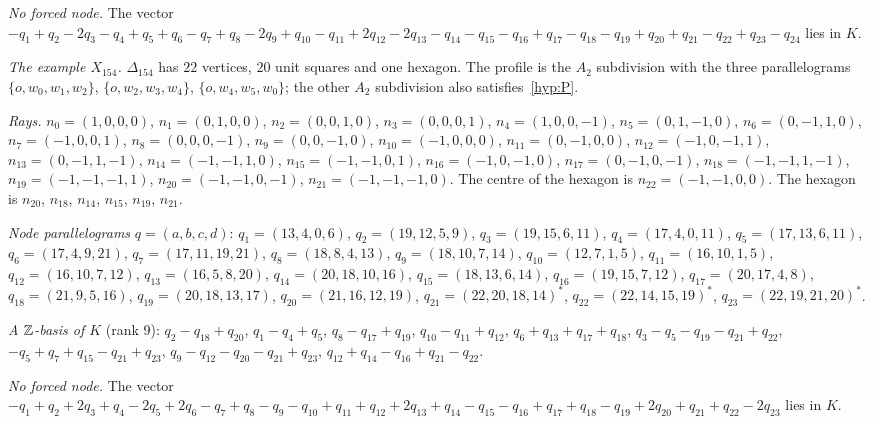 \emph{No forced node.} The vector $-q_{1}+q_{2}-2q_{3}-q_{4}+q_{5}+q_{6}-q_{7}+q_{8}-2q_{9}+q_{10}-q_{11}+2q_{12}-2q_{13}-q_{14}-q_{15}-q_{16}+q_{17}-q_{18}-q_{19}+q_{20}+q_{21}-q_{22}+q_{23}-q_{24}$ lies in $K$.

\emph{The example $X_{154}$.} $\Delta_{154}$ has $22$ vertices, $20$ unit squares and one hexagon. The profile is the $A_2$ subdivision with the three parallelograms $\{o,w_0,w_1,w_2\}$, $\{o,w_2,w_3,w_4\}$, $\{o,w_4,w_5,w_0\}$; the other $A_2$ subdivision also satisfies~\ref{hyp:P}.

\emph{Rays.} $n_{0}=(1,0,0,0)$, $n_{1}=(0,1,0,0)$, $n_{2}=(0,0,1,0)$, $n_{3}=(0,0,0,1)$, $n_{4}=(1,0,0,-1)$, $n_{5}=(0,1,-1,0)$, $n_{6}=(0,-1,1,0)$, $n_{7}=(-1,0,0,1)$, $n_{8}=(0,0,0,-1)$, $n_{9}=(0,0,-1,0)$, $n_{10}=(-1,0,0,0)$, $n_{11}=(0,-1,0,0)$, $n_{12}=(-1,0,-1,1)$, $n_{13}=(0,-1,1,-1)$, $n_{14}=(-1,-1,1,0)$, $n_{15}=(-1,-1,0,1)$, $n_{16}=(-1,0,-1,0)$, $n_{17}=(0,-1,0,-1)$, $n_{18}=(-1,-1,1,-1)$, $n_{19}=(-1,-1,-1,1)$, $n_{20}=(-1,-1,0,-1)$, $n_{21}=(-1,-1,-1,0)$. The centre of the hexagon is $n_{22}=(-1,-1,0,0)$. The hexagon is $n_{20}$, $n_{18}$, $n_{14}$, $n_{15}$, $n_{19}$, $n_{21}$.

\emph{Node parallelograms} $q=(a,b,c,d)$: $q_{1}=(13,4,0,6)$, $q_{2}=(19,12,5,9)$, $q_{3}=(19,15,6,11)$, $q_{4}=(17,4,0,11)$, $q_{5}=(17,13,6,11)$, $q_{6}=(17,4,9,21)$, $q_{7}=(17,11,19,21)$, $q_{8}=(18,8,4,13)$, $q_{9}=(18,10,7,14)$, $q_{10}=(12,7,1,5)$, $q_{11}=(16,10,1,5)$, $q_{12}=(16,10,7,12)$, $q_{13}=(16,5,8,20)$, $q_{14}=(20,18,10,16)$, $q_{15}=(18,13,6,14)$, $q_{16}=(19,15,7,12)$, $q_{17}=(20,17,4,8)$, $q_{18}=(21,9,5,16)$, $q_{19}=(20,18,13,17)$, $q_{20}=(21,16,12,19)$, $q_{21}=(22,20,18,14)^{*}$, $q_{22}=(22,14,15,19)^{*}$, $q_{23}=(22,19,21,20)^{*}$.

\emph{A $\mathbb Z$-basis of $K$} (rank 9): $q_{2}-q_{18}+q_{20}$, $q_{1}-q_{4}+q_{5}$, $q_{8}-q_{17}+q_{19}$, $q_{10}-q_{11}+q_{12}$, $q_{6}+q_{13}+q_{17}+q_{18}$, $q_{3}-q_{5}-q_{19}-q_{21}+q_{22}$, $-q_{5}+q_{7}+q_{15}-q_{21}+q_{23}$, $q_{9}-q_{12}-q_{20}-q_{21}+q_{23}$, $q_{12}+q_{14}-q_{16}+q_{21}-q_{22}$.

\emph{No forced node.} The vector $-q_{1}+q_{2}+2q_{3}+q_{4}-2q_{5}+2q_{6}-q_{7}+q_{8}-q_{9}-q_{10}+q_{11}+q_{12}+2q_{13}+q_{14}-q_{15}-q_{16}+q_{17}+q_{18}-q_{19}+2q_{20}+q_{21}+q_{22}-2q_{23}$ lies in $K$.

\endgroup
